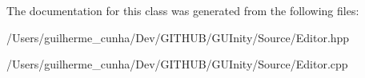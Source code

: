 The documentation for this class was generated from the following files\+:\begin{DoxyCompactItemize}
\item 
/\+Users/guilherme\+\_\+cunha/\+Dev/\+G\+I\+T\+H\+U\+B/\+G\+U\+Inity/\+Source/Editor.\+hpp\item 
/\+Users/guilherme\+\_\+cunha/\+Dev/\+G\+I\+T\+H\+U\+B/\+G\+U\+Inity/\+Source/Editor.\+cpp\end{DoxyCompactItemize}
